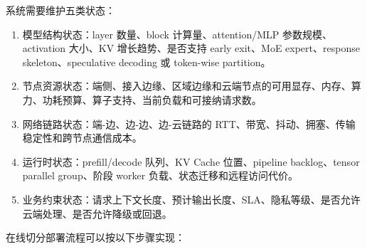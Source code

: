 \documentclass[a4paper,twocolumn,10pt]{ctexart}
\begin{document}
系统需要维护五类状态：


\begin{enumerate}
\item 模型结构状态：layer 数量、block 计算量、attention/MLP 参数规模、activation 大小、KV 增长趋势、是否支持 early exit、MoE expert、response skeleton、speculative decoding 或 token-wise partition。

\item 节点资源状态：端侧、接入边缘、区域边缘和云端节点的可用显存、内存、算力、功耗预算、算子支持、当前负载和可接纳请求数。

\item 网络链路状态：端-边、边-边、边-云链路的 RTT、带宽、抖动、拥塞、传输稳定性和跨节点通信成本。

\item 运行时状态：prefill/decode 队列、KV Cache 位置、pipeline backlog、tensor parallel group、阶段 worker 负载、状态迁移和远程访问代价。

\item 业务约束状态：请求上下文长度、预计输出长度、SLA、隐私等级、是否允许云端处理、是否允许降级或回退。

\end{enumerate}
在线切分部署流程可以按以下步骤实现：
\end{document}
